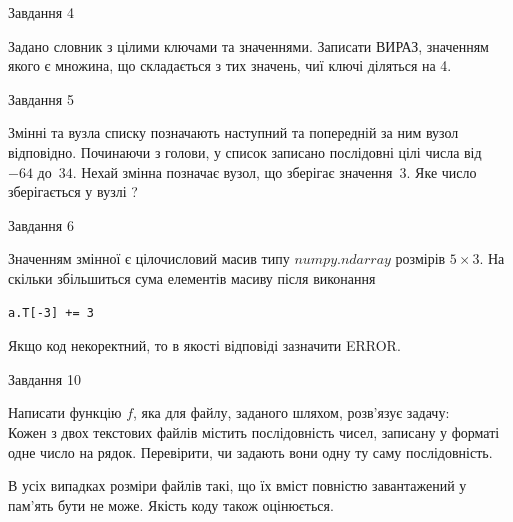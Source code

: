 \documentclass[12pt, ukrainian]{article}
\begin{document}
{\begin{minipage}[t]{8.0cm}
\end{minipage}

               
{\begin{center}Завдання {4}\end{center}}
\vspace{-6mm}
Задано словник  з цілими ключами та значеннями. Записати ВИРАЗ, значенням якого є множина, що складається  з тих значень, чиї ключі діляться на 4.\par

\vspace{10mm}
               
{\begin{center}Завдання {5}\end{center}}
\vspace{-6mm}
Змінні  та  вузла списку позначають наступний та попередній за ним вузол відповідно. Починаючи з голови, у список записано послідовні цілі числа від~$-64$ до~$34$. Нехай змінна  позначає вузол, що зберігає значення~$3$.
Яке число зберігається у вузлі  ?\par

               
{\begin{center}Завдання {6}\end{center}}
\vspace{-6mm}
Значенням змінної  є цілочисловий масив типу $numpy.ndarray$ розмірів $5{\times}3$. На скільки збільшиться сума елементів масиву  після виконання
\begin{verbatim}
a.T[-3] += 3
\end{verbatim}


Якщо код некоректний, то в якості відповіді зазначити ERROR.\par

               
{\begin{center}Завдання {10}\end{center}}
\vspace{-6mm}

Написати функцію $f$, яка для файлу, заданого шляхом, розв’язує задачу:\\ Кожен з двох текстових файлів містить послідовність чисел, записану у форматі одне число на рядок.  Перевірити, чи задають вони одну ту саму послідовність.

В усіх випадках розміри файлів такі, що їх вміст повністю завантажений у пам'ять бути не може. Якість коду також оцінюється.



}
\end{document}
